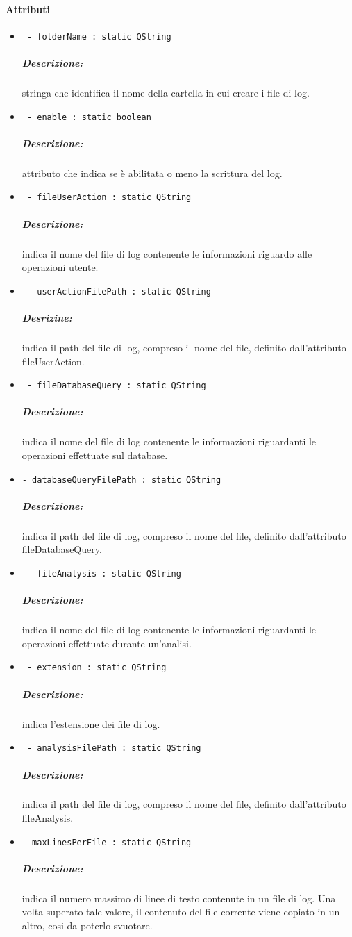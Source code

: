 \paragraph{\color{black}Attributi \\}
	\begin{itemize}
		\item \color{teal}\verb! - folderName : static QString !
		\color{black}
		\subparagraph{Descrizione:} stringa che identifica il nome della cartella in cui creare i file di log.
		
		\item \color{teal}\verb! - enable : static boolean!
		\color{black}
		\subparagraph{Descrizione:} attributo che indica se è abilitata o meno  la scrittura del log.
		
		\item \color{teal}\verb! - fileUserAction : static QString !
		\color{black}
		\subparagraph{Descrizione:} indica il nome del file di log contenente le informazioni riguardo alle operazioni utente.
		
		\item \color{teal}\verb! - userActionFilePath : static QString !
		\color{black} 
		\subparagraph{Desrizine: } indica il path del file di log, compreso il nome del file, definito dall'attributo fileUserAction.
		
		\item \color{teal}\verb! - fileDatabaseQuery : static QString !
		\color{black} 
		\subparagraph{Descrizione:} indica il nome del file di log contenente le informazioni riguardanti le operazioni effettuate sul database.
		
		\item \color{teal}\verb!- databaseQueryFilePath : static QString !
		\color{black} 
		\subparagraph{Descrizione:} indica il path del file di log, compreso il nome del file, definito dall'attributo fileDatabaseQuery.
	
		\item \color{teal}\verb! - fileAnalysis : static QString !
		\color{black} 
		\subparagraph{Descrizione:} indica il nome del file di log contenente le informazioni riguardanti le operazioni effettuate durante un'analisi.
	
		\item \color{teal}\verb! - extension : static QString !
		\color{black} 
		\subparagraph{Descrizione:} indica l'estensione dei file di log.
		
		\item \color{teal}\verb! - analysisFilePath : static QString!
		\color{black}
		\subparagraph{Descrizione:} indica il path del file di log, compreso il nome del file, definito dall'attributo fileAnalysis.
		
		\item\color{teal}\verb!- maxLinesPerFile : static QString !
		\color{black} 
		\subparagraph{Descrizione:} indica il numero massimo di linee di testo contenute in un file di log.  Una volta superato tale valore, il contenuto del file corrente viene copiato in un altro, cosi da poterlo svuotare.		
	\end{itemize}


